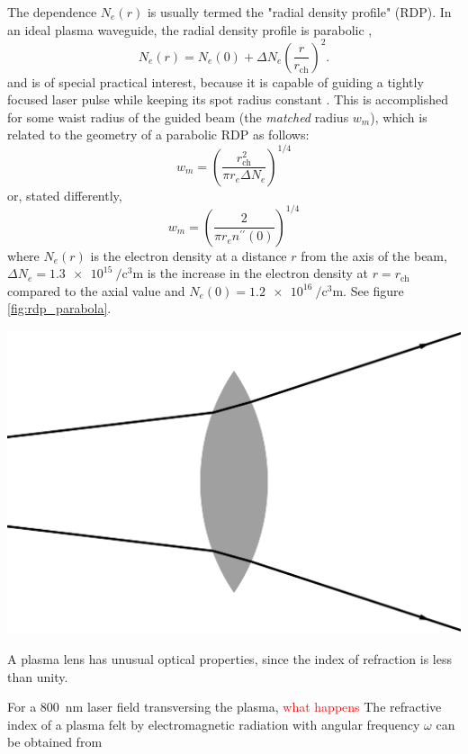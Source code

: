 \documentclass[justified,nofonts,nobib,openany]{tufte-book}
\begin{document}
The dependence $N_e(r)$ is usually termed the "radial density profile" (RDP). In an ideal plasma waveguide, the radial density profile is parabolic \cite{Sprangle1992PropagationPlasmas},
\begin{equation}
    N_e(r)=N_e(0)+\Delta N_e\left( \frac{r}{r_\text{ch}}\right)^2.
    \label{eq:rdp}
\end{equation}
and is of special practical interest, because it is capable of guiding a tightly focused laser pulse while keeping its spot radius constant \cite{Sprangle1992PropagationPlasmas,Esarey1997Self-focusingPlasmas}. This is accomplished for some waist radius of the guided beam (the \textit{matched} radius $w_m$), which is related to the geometry of a parabolic RDP as follows:
\begin{equation}
    w_m=\left( \frac{r_\text{ch}^2}{\pi r_e \Delta N_e}\right)^{1/4}
\end{equation}
or, stated differently,
\begin{equation}
    w_m=\left( \frac{2}{\pi r_e n^{\prime\prime}(0)}\right)^{1/4}
\end{equation}
where $N_e(r)$ is the electron density at a distance $r$ from the axis of the beam, $\Delta N_e=\SI{1.3e15}{\per\cubic\centi\metre}$ is the increase in the electron density at $r=r_\text{ch}$ compared to the axial value and $N_e(0)=\SI{1.2e16}{\per\cubic\centi\metre}$. See figure \ref{fig:rdp_parabola}.

\begin{marginfigure}
    \includegraphics[width=\marginparwidth]{figures/chen4_30.pdf}
    \caption{A plasma lens has unusual optical properties, since the index of refraction is less than unity.}
    \label{fig:plasma_lens_chen}
\end{marginfigure}
For a \SI{800}{\nm} laser field transversing the plasma, \textcolor{red}{what happens}
The refractive index of a plasma felt by electromagnetic radiation with angular frequency $\omega$ can be obtained from 
\end{document}

